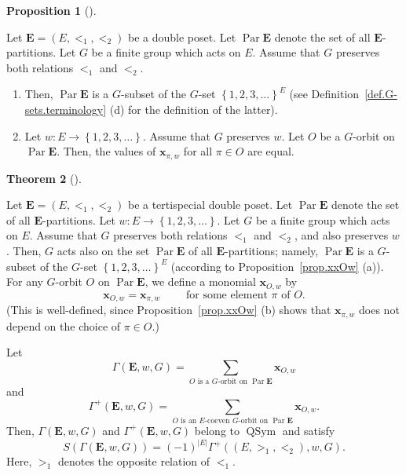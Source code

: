 \documentclass[numbers=enddot,12pt,final,onecolumn,notitlepage,abstracton]{scrartcl}
\theoremstyle{definition}
\newtheorem{theo}{Theorem}[section]
\newenvironment{theorem}[1][]
{\begin{theo}[#1]\begin{leftbar}}
{\end{leftbar}\end{theo}}
\newtheorem{prop}[theo]{Proposition}
\newenvironment{proposition}[1][]
{\begin{prop}[#1]\begin{leftbar}}
{\end{leftbar}\end{prop}}
\let\sumnonlimits\sum
\renewcommand{\sum}{\sumnonlimits\limits}
\newcommand{\xx}{{\mathbf{x}}}
\newcommand{\QSym}{{\operatorname{QSym}}}
\newcommand{\Par}{\operatorname{Par}}
\newcommand{\EE}{{\mathbf{E}}}
\begin{document}
\begin{proposition}
\label{prop.xxOw}
Let $\EE = \left(E, <_1, <_2\right)$ be a double poset.
Let $\Par \EE$ denote the set of all $\EE$-partitions.
Let $G$ be a finite
group which acts on $E$. Assume that $G$ preserves both
relations $<_1$ and $<_2$.

\begin{enumerate}

\item[(a)]
Then, $\Par \EE$ is a $G$-subset of the $G$-set
$\left\{1, 2, 3, \ldots\right\}^E$ (see
Definition~\ref{def.G-sets.terminology} (d) for the definition of
the latter).

\item[(b)] Let $w : E \to \left\{1, 2, 3, \ldots\right\}$. Assume that
$G$ preserves $w$.
Let $O$ be a $G$-orbit on $\Par \EE$. Then, the values of $\xx_{\pi, w}$
for all $\pi \in O$ are equal.

\end{enumerate}

\end{proposition}


\begin{theorem}
\label{thm.antipode.GammawG}
Let $\EE = \left(E, <_1, <_2\right)$ be a tertispecial double poset.
Let $\Par \EE$ denote the set of all $\EE$-partitions.
Let $w : E \to \left\{1, 2, 3, \ldots\right\}$. Let $G$ be a finite
group which acts on $E$. Assume that $G$ preserves both
relations $<_1$ and $<_2$, and also preserves $w$.
Then, $G$ acts also on the set $\Par \EE$ of all
$\EE$-partitions; namely, $\Par \EE$ is a $G$-subset of the $G$-set
$\left\{1, 2, 3, \ldots\right\}^E$ (according to
Proposition~\ref{prop.xxOw} (a)).
For any $G$-orbit $O$ on $\Par \EE$, we define a monomial $\xx_{O, w}$
by
\[ \xx_{O, w} = \xx_{\pi, w} \qquad \text{ for some element }
\pi \text{ of } O .
\]
(This is well-defined, since Proposition~\ref{prop.xxOw} (b) shows
that $\xx_{\pi, w}$ does not depend on the choice of $\pi \in O$.)

Let
\[
\Gamma\left(\EE, w, G\right) = \sum_{O\text{ is a }
G\text{-orbit on } \Par \EE} \xx_{O, w}
\]
and
\[
\Gamma^+\left(\EE, w, G\right) = \sum_{O\text{ is an }E\text{-coeven }
G\text{-orbit on } \Par \EE} \xx_{O, w} .
\]
Then, $\Gamma\left(\EE, w, G\right)$ and
$\Gamma^+\left(\EE, w, G\right)$ belong to $\QSym$ and satisfy
\[
S\left(\Gamma\left(\EE, w, G\right)\right)
= \left(-1\right)^{\left|E\right|}
\Gamma^+\left(\left(E, >_1, <_2\right), w, G\right) .
\]
Here, $>_1$ denotes the opposite relation of $<_1$.
\end{theorem}
\end{document}
